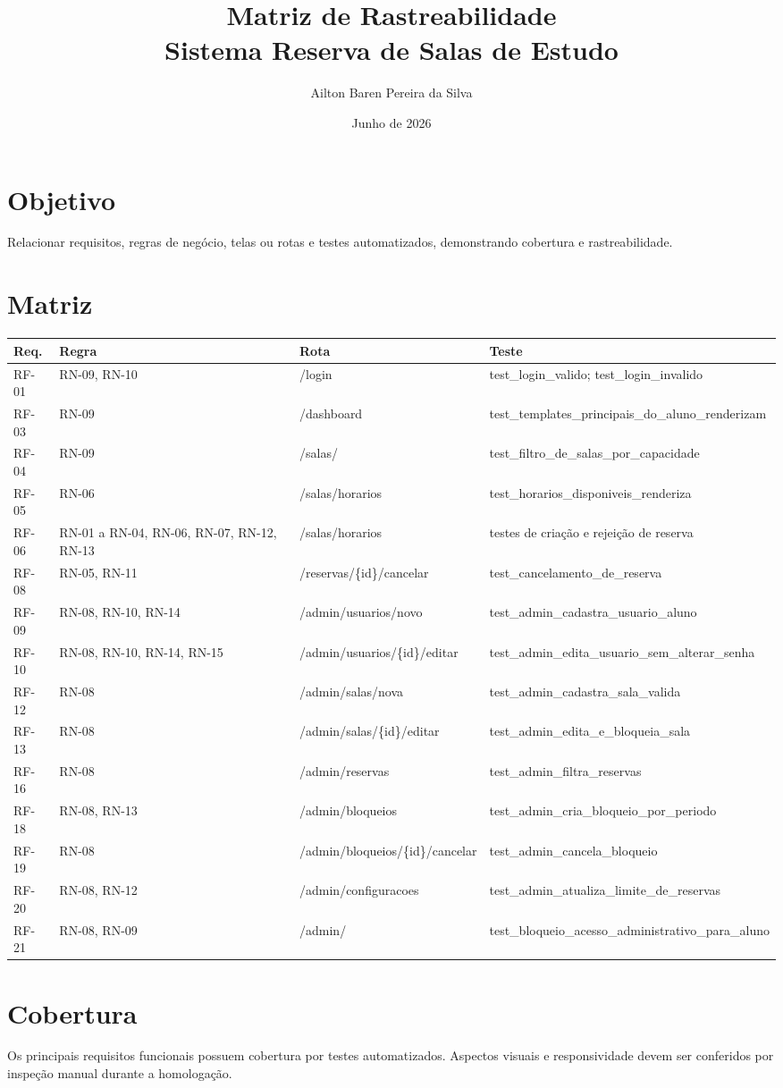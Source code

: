 \documentclass[12pt,a4paper]{article}
\title{\textbf{Matriz de Rastreabilidade}\\Sistema Reserva de Salas de Estudo}
\author{Ailton Baren Pereira da Silva}
\date{Junho de 2026}
\begin{document}
\maketitle

\section{Objetivo}
Relacionar requisitos, regras de negócio, telas ou rotas e testes automatizados, demonstrando cobertura e rastreabilidade.

\section{Matriz}
\small
\begin{longtable}{|p{2cm}|p{2.5cm}|p{3cm}|p{7cm}|}
\hline
\textbf{Req.} & \textbf{Regra} & \textbf{Rota} & \textbf{Teste} \\ \hline
RF-01 & RN-09, RN-10 & /login & test\_login\_valido; test\_login\_invalido \\ \hline
RF-03 & RN-09 & /dashboard & test\_templates\_principais\_do\_aluno\_renderizam \\ \hline
RF-04 & RN-09 & /salas/ & test\_filtro\_de\_salas\_por\_capacidade \\ \hline
RF-05 & RN-06 & /salas/horarios & test\_horarios\_disponiveis\_renderiza \\ \hline
RF-06 & RN-01 a RN-04, RN-06, RN-07, RN-12, RN-13 & /salas/horarios & testes de criação e rejeição de reserva \\ \hline
RF-08 & RN-05, RN-11 & /reservas/\{id\}/cancelar & test\_cancelamento\_de\_reserva \\ \hline
RF-09 & RN-08, RN-10, RN-14 & /admin/usuarios/novo & test\_admin\_cadastra\_usuario\_aluno \\ \hline
RF-10 & RN-08, RN-10, RN-14, RN-15 & /admin/usuarios/\{id\}/editar & test\_admin\_edita\_usuario\_sem\_alterar\_senha \\ \hline
RF-12 & RN-08 & /admin/salas/nova & test\_admin\_cadastra\_sala\_valida \\ \hline
RF-13 & RN-08 & /admin/salas/\{id\}/editar & test\_admin\_edita\_e\_bloqueia\_sala \\ \hline
RF-16 & RN-08 & /admin/reservas & test\_admin\_filtra\_reservas \\ \hline
RF-18 & RN-08, RN-13 & /admin/bloqueios & test\_admin\_cria\_bloqueio\_por\_periodo \\ \hline
RF-19 & RN-08 & /admin/bloqueios/\{id\}/cancelar & test\_admin\_cancela\_bloqueio \\ \hline
RF-20 & RN-08, RN-12 & /admin/configuracoes & test\_admin\_atualiza\_limite\_de\_reservas \\ \hline
RF-21 & RN-08, RN-09 & /admin/ & test\_bloqueio\_acesso\_administrativo\_para\_aluno \\ \hline
\end{longtable}
\normalsize

\section{Cobertura}
Os principais requisitos funcionais possuem cobertura por testes automatizados. Aspectos visuais e responsividade devem ser conferidos por inspeção manual durante a homologação.
\end{document}
